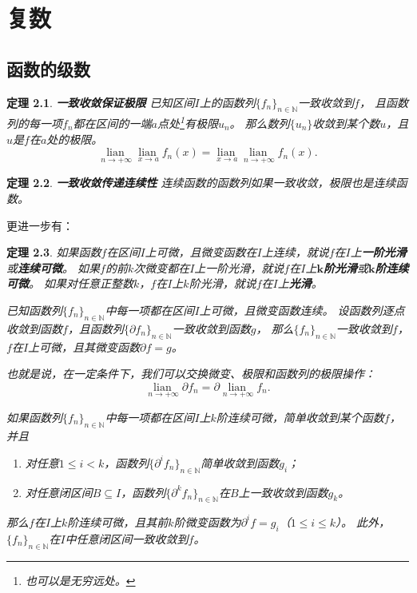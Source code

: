\documentclass[12pt,UTF8]{ctexbook}
\newcommand{\lian}[1]{
    \underset{#1}{\operatorname{lian}\,}
}
\newtheorem{tm}{定理}[section]
\begin{document}
\chapter{复数}

\begin{appendix}

\chapter{函数的级数}
\begin{tm}{\textbf{一致收敛保证极限}}
    已知区间$I$上的函数列$\{f_n\}_{n\in\mathbb{N}}$一致收敛到$f$，
    且函数列的每一项$f_n$都在区间的一端$a$点处\footnote{也可以是无穷远处。}有极限$u_n$。
    那么数列$\{u_n\}$收敛到某个数$u$，且$u$是$f$在$a$处的极限。
    $$ \lian{n\to +\infty} \lian{x\to a} f_n(x) = \lian{x\to a} \lian{n\to +\infty} f_n(x). $$
\end{tm}

\begin{tm}{\textbf{一致收敛传递连续性}}
    连续函数的函数列如果一致收敛，极限也是连续函数。
\end{tm}

更进一步有：

\begin{tm}
    如果函数$f$在区间$I$上可微，且微变函数在$I$上连续，就说$f$在$I$上\textbf{一阶光滑}或\textbf{连续可微}。
    如果$f$的前$k$次微变都在$I$上一阶光滑，就说$f$在$I$上$\boldsymbol{k}$\textbf{阶光滑}或$\boldsymbol{k}$\textbf{阶连续可微}。
    如果对任意正整数$k$，$f$在$I$上$k$阶光滑，就说$f$在$I$上\textbf{光滑}。

    已知函数列$\{f_n\}_{n\in\mathbb{N}}$中每一项都在区间$I$上可微，且微变函数连续。
    设函数列逐点收敛到函数$f$，且函数列$\{\partial f_n\}_{n\in\mathbb{N}}$一致收敛到函数$g$，
    那么$\{f_n\}_{n\in\mathbb{N}}$一致收敛到$f$，
    $f$在$I$上可微，且其微变函数$\partial f = g$。

    也就是说，在一定条件下，我们可以交换微变、极限和函数列的极限操作：
    $$ \lian{n\to +\infty} \partial f_n = \partial \lian{n\to +\infty} f_n. $$

    如果函数列$\{f_n\}_{n\in\mathbb{N}}$中每一项都在区间$I$上$k$阶连续可微，简单收敛到某个函数$f$，并且
    \begin{enumerate}
        \item 对任意$1 \leqslant i < k$，函数列$\{\partial^i f_n\}_{n\in\mathbb{N}}$简单收敛到函数$g_i$；
        \item 对任意闭区间$B \subseteq I$，函数列$\{\partial^k f_n\}_{n\in\mathbb{N}}$在$B$上一致收敛到函数$g_k$。
    \end{enumerate}
    那么$f$在$I$上$k$阶连续可微，且其前$k$阶微变函数为$\partial^i f = g_i$（$1 \leqslant i\leqslant k$）。
    此外，$\{f_n\}_{n\in\mathbb{N}}$在$I$中任意闭区间一致收敛到$f$。

\end{tm}

\end{appendix}
\end{document}
